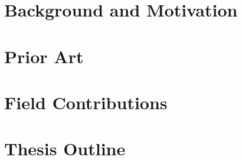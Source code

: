\documentclass[../Thesis.tex]{subfiles}
\begin{document}
\section{Background and Motivation}


\section{Prior Art}


\section{Field Contributions}


\section{Thesis Outline}

\end{document}
